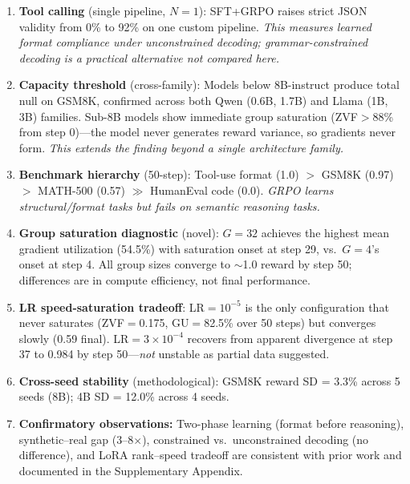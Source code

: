 \documentclass{article}
\begin{document}
\begin{enumerate}
    \item \textbf{Tool calling} (single pipeline, $N{=}1$): SFT+GRPO raises strict JSON validity from 0\% to 92\% on one custom pipeline. \emph{This measures learned format compliance under unconstrained decoding; grammar-constrained decoding is a practical alternative not compared here.}
    \item \textbf{Capacity threshold} (cross-family): Models below 8B-instruct produce total null on GSM8K, confirmed across both Qwen (0.6B, 1.7B) and Llama (1B, 3B) families. Sub-8B models show immediate group saturation (ZVF$>$88\% from step 0)---the model never generates reward variance, so gradients never form. \emph{This extends the finding beyond a single architecture family.}
    \item \textbf{Benchmark hierarchy} (50-step): Tool-use format (1.0) $>$ GSM8K (0.97) $>$ MATH-500 (0.57) $\gg$ HumanEval code (0.0). \emph{GRPO learns structural/format tasks but fails on semantic reasoning tasks.}
    \item \textbf{Group saturation diagnostic} (novel): $G{=}32$ achieves the highest mean gradient utilization (54.5\%) with saturation onset at step 29, vs.\ $G{=}4$'s onset at step 4. All group sizes converge to ${\sim}$1.0 reward by step 50; differences are in compute efficiency, not final performance.
    \item \textbf{LR speed-saturation tradeoff}: LR$=10^{-5}$ is the only configuration that never saturates (ZVF$=$0.175, GU$=$82.5\% over 50 steps) but converges slowly (0.59 final). LR$=3\times10^{-4}$ recovers from apparent divergence at step 37 to 0.984 by step 50---\emph{not} unstable as partial data suggested.
    \item \textbf{Cross-seed stability} (methodological): GSM8K reward SD = 3.3\% across 5 seeds (8B); 4B SD = 12.0\% across 4 seeds.
    \item \textbf{Confirmatory observations:} Two-phase learning (format before reasoning), synthetic--real gap (3--8$\times$), constrained vs.\ unconstrained decoding (no difference), and LoRA rank--speed tradeoff are consistent with prior work and documented in the Supplementary Appendix.

\end{enumerate}
\end{document}
